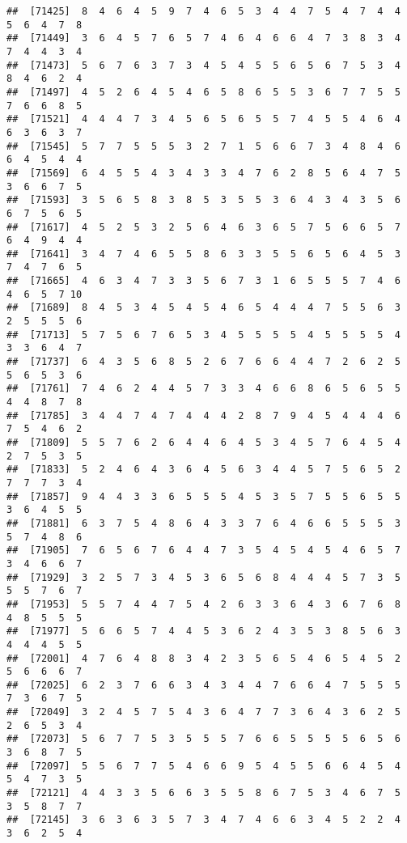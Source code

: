 \documentclass[
]{book}
\begin{document}
\begin{verbatim}
##  [71425]  8  4  6  4  5  9  7  4  6  5  3  4  4  7  5  4  7  4  4  5  6  4  7  8
##  [71449]  3  6  4  5  7  6  5  7  4  6  4  6  6  4  7  3  8  3  4  7  4  4  3  4
##  [71473]  5  6  7  6  3  7  3  4  5  4  5  5  6  5  6  7  5  3  4  8  4  6  2  4
##  [71497]  4  5  2  6  4  5  4  6  5  8  6  5  5  3  6  7  7  5  5  7  6  6  8  5
##  [71521]  4  4  4  7  3  4  5  6  5  6  5  5  7  4  5  5  4  6  4  6  3  6  3  7
##  [71545]  5  7  7  5  5  5  3  2  7  1  5  6  6  7  3  4  8  4  6  6  4  5  4  4
##  [71569]  6  4  5  5  4  3  4  3  3  4  7  6  2  8  5  6  4  7  5  3  6  6  7  5
##  [71593]  3  5  6  5  8  3  8  5  3  5  5  3  6  4  3  4  3  5  6  6  7  5  6  5
##  [71617]  4  5  2  5  3  2  5  6  4  6  3  6  5  7  5  6  6  5  7  6  4  9  4  4
##  [71641]  3  4  7  4  6  5  5  8  6  3  3  5  5  6  5  6  4  5  3  7  4  7  6  5
##  [71665]  4  6  3  4  7  3  3  5  6  7  3  1  6  5  5  5  7  4  6  4  6  5  7 10
##  [71689]  8  4  5  3  4  5  4  5  4  6  5  4  4  4  7  5  5  6  3  2  5  5  5  6
##  [71713]  5  7  5  6  7  6  5  3  4  5  5  5  5  4  5  5  5  5  4  3  3  6  4  7
##  [71737]  6  4  3  5  6  8  5  2  6  7  6  6  4  4  7  2  6  2  5  5  6  5  3  6
##  [71761]  7  4  6  2  4  4  5  7  3  3  4  6  6  8  6  5  6  5  5  4  4  8  7  8
##  [71785]  3  4  4  7  4  7  4  4  4  2  8  7  9  4  5  4  4  4  6  7  5  4  6  2
##  [71809]  5  5  7  6  2  6  4  4  6  4  5  3  4  5  7  6  4  5  4  2  7  5  3  5
##  [71833]  5  2  4  6  4  3  6  4  5  6  3  4  4  5  7  5  6  5  2  7  7  7  3  4
##  [71857]  9  4  4  3  3  6  5  5  5  4  5  3  5  7  5  5  6  5  5  3  6  4  5  5
##  [71881]  6  3  7  5  4  8  6  4  3  3  7  6  4  6  6  5  5  5  3  5  7  4  8  6
##  [71905]  7  6  5  6  7  6  4  4  7  3  5  4  5  4  5  4  6  5  7  3  4  6  6  7
##  [71929]  3  2  5  7  3  4  5  3  6  5  6  8  4  4  4  5  7  3  5  5  5  7  6  7
##  [71953]  5  5  7  4  4  7  5  4  2  6  3  3  6  4  3  6  7  6  8  4  8  5  5  5
##  [71977]  5  6  6  5  7  4  4  5  3  6  2  4  3  5  3  8  5  6  3  4  4  4  5  5
##  [72001]  4  7  6  4  8  8  3  4  2  3  5  6  5  4  6  5  4  5  2  5  6  6  6  7
##  [72025]  6  2  3  7  6  6  3  4  3  4  4  7  6  6  4  7  5  5  5  7  3  6  7  5
##  [72049]  3  2  4  5  7  5  4  3  6  4  7  7  3  6  4  3  6  2  5  2  6  5  3  4
##  [72073]  5  6  7  7  5  3  5  5  5  7  6  6  5  5  5  5  6  5  6  3  6  8  7  5
##  [72097]  5  5  6  7  7  5  4  6  6  9  5  4  5  5  6  6  4  5  4  5  4  7  3  5
##  [72121]  4  4  3  3  5  6  6  3  5  5  8  6  7  5  3  4  6  7  5  3  5  8  7  7
##  [72145]  3  6  3  6  3  5  7  3  4  7  4  6  6  3  4  5  2  2  4  3  6  2  5  4

\end{verbatim}
\end{document}
